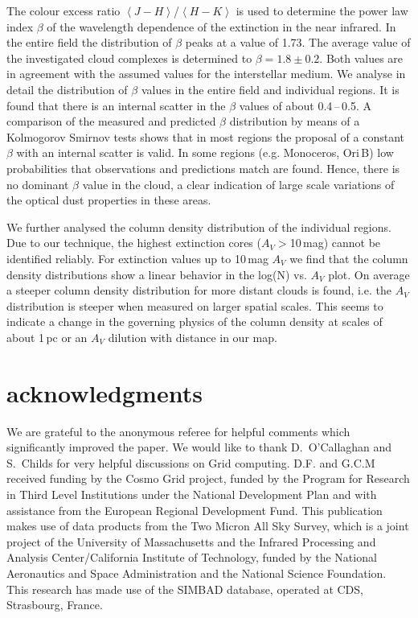 \documentclass[useAMS,usenatbib]{mn2e}
\begin{document}
The colour excess ratio $\left< J-H \right>$/$\left< H-K \right>$ is used to
determine the power law index $\beta$ of the wavelength dependence of the
extinction in the near infrared. In the entire field the distribution of $\beta$
peaks at a value of 1.73. The average value of the investigated cloud complexes
is determined to $\beta = 1.8 \pm 0.2$. Both values are in agreement with the
assumed values for the interstellar medium. We analyse in detail the
distribution of $\beta$ values in the entire field and individual regions. It is
found that there is an internal scatter in the $\beta$ values of about
0.4\,--\,0.5. A comparison of the measured and predicted $\beta$ distribution by
means of a Kolmogorov Smirnov tests shows that in most regions the proposal of a
constant $\beta$ with an internal scatter is valid. In some regions (e.g.
Monoceros, Ori\,B) low probabilities that observations and predictions match are
found. Hence, there is no dominant $\beta$ value in the cloud, a clear
indication of large scale variations of the optical dust properties in these
areas.

We further analysed the column density distribution of the individual regions.
Due to our technique, the highest extinction cores ($A_V >$10\,mag) cannot be
identified reliably. For extinction values up to 10\,mag $A_V$ we find that the
column density distributions show a linear behavior in the log(N) vs. $A_V$
plot. On average a steeper column density distribution for more distant clouds
is found, i.e. the $A_V$ distribution is steeper when measured on larger spatial
scales. This seems to indicate a change in the governing physics of the
column density at scales of about 1\,pc or an $A_V$ dilution with distance in
our map.

\section*{acknowledgments}
 
We are grateful to the anonymous referee for helpful comments which
significantly improved the paper. We would like to thank D.~O'Callaghan and
S.~Childs for very helpful discussions on Grid computing. D.F. and G.C.M
received funding by the Cosmo Grid project, funded by the Program for Research
in Third Level Institutions under the National Development Plan and with
assistance from the European Regional Development Fund. This publication makes
use of data products from the Two Micron All Sky Survey, which is a joint
project of the University of Massachusetts and the Infrared Processing and
Analysis Center/California Institute of Technology, funded by the National
Aeronautics and Space Administration and the National Science Foundation. This
research has made use of the SIMBAD database, operated at CDS, Strasbourg,
France.
\end{document}
